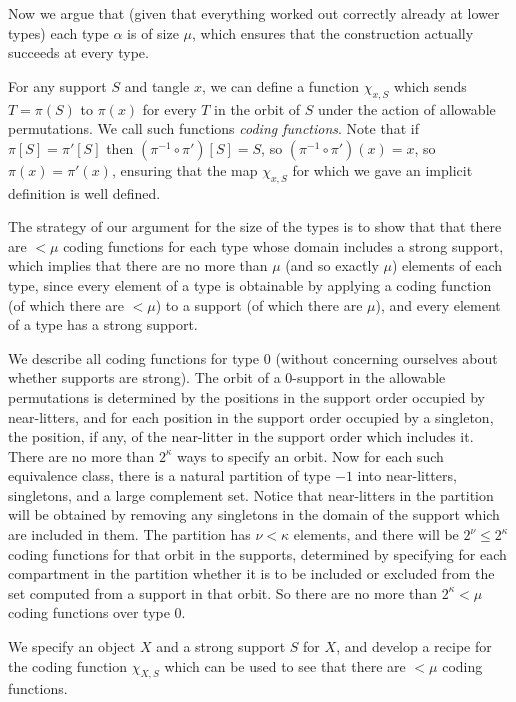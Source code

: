 Now we argue that (given that everything worked out correctly already at lower types) each type $\alpha$ is of size $\mu$, which ensures
that the construction actually succeeds at every type.

\begin{definition}
\label {def:coding-function}
For any support $S$ and tangle $x$, we can define a function $\chi_{x,S}$ which sends $T=\pi(S)$ to $\pi(x)$ for every $T$ in the orbit of $S$ under
the action of allowable permutations.  We call such functions {\em coding functions\/}.  Note that if $\pi[S]=\pi'[S]$ then $(\pi^{-1}\circ \pi')[S]= S$, so
$(\pi^{-1}\circ \pi')(x)= x$, so $\pi(x)=\pi'(x)$, ensuring that the map $\chi_{x,S}$ for which we gave an implicit definition is well defined.
\end{definition}

The strategy of our argument for the size of the types is to show that that there are $<\mu$ coding functions for each type whose domain includes a strong support, which implies that there are no more than $\mu$ (and so exactly $\mu$) elements of each type, since every element of a type is obtainable by applying a coding function (of which there are $<\mu$) to a support (of which there are $\mu$), and every element of a type has a strong support.

We describe all coding functions for type 0 (without concerning ourselves about whether supports are strong).  The orbit of a 0-support in the allowable permutations is determined by the positions in the support order occupied by near-litters, and for each position in the support order occupied by a singleton, the position, if any, of the near-litter in the support order which includes it.  There are no more than $2^\kappa$ ways to specify an orbit.  Now for each such equivalence class, there is a natural partition of type $-1$ into near-litters, singletons, and a large complement set.  Notice that near-litters in the partition will be obtained by removing any singletons in the domain of the support which are included in them.  The partition has $\nu<\kappa$ elements, and there will be $2^\nu\leq 2^\kappa$ coding functions for that orbit in the supports, determined by specifying for each compartment in the partition whether it is to be included or excluded from the set computed from a support in that orbit.  So there are no more than $2^\kappa<\mu$ coding functions over type 0.

We specify an object $X$ and a strong support $S$ for $X$, and develop a recipe for the coding function $\chi_{X,S}$ which can be used to see that there are $<\mu$ coding functions.

